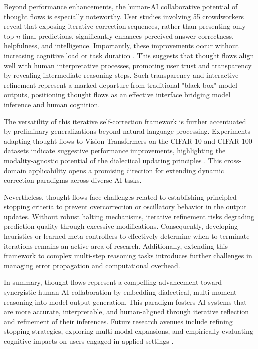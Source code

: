 \documentclass[sigconf]{acmart}
\begin{document}
Beyond performance enhancements, the human-AI collaborative potential of thought flows is especially noteworthy. User studies involving 55 crowdworkers reveal that exposing iterative correction sequences, rather than presenting only top-$n$ final predictions, significantly enhances perceived answer correctness, helpfulness, and intelligence. Importantly, these improvements occur without increasing cognitive load or task duration \cite{ref43}. This suggests that thought flows align well with human interpretative processes, promoting user trust and transparency by revealing intermediate reasoning steps. Such transparency and interactive refinement represent a marked departure from traditional "black-box" model outputs, positioning thought flows as an effective interface bridging model inference and human cognition.

The versatility of this iterative self-correction framework is further accentuated by preliminary generalizations beyond natural language processing. Experiments adapting thought flows to Vision Transformers on the CIFAR-10 and CIFAR-100 datasets indicate suggestive performance improvements, highlighting the modality-agnostic potential of the dialectical updating principles \cite{ref43}. This cross-domain applicability opens a promising direction for extending dynamic correction paradigms across diverse AI tasks.

Nevertheless, thought flows face challenges related to establishing principled stopping criteria to prevent overcorrection or oscillatory behavior in the output updates. Without robust halting mechanisms, iterative refinement risks degrading prediction quality through excessive modifications. Consequently, developing heuristics or learned meta-controllers to effectively determine when to terminate iterations remains an active area of research. Additionally, extending this framework to complex multi-step reasoning tasks introduces further challenges in managing error propagation and computational overhead.

In summary, thought flows represent a compelling advancement toward synergistic human-AI collaboration by embedding dialectical, multi-moment reasoning into model output generation. This paradigm fosters AI systems that are more accurate, interpretable, and human-aligned through iterative reflection and refinement of their inferences. Future research avenues include refining stopping strategies, exploring multi-modal expansions, and empirically evaluating cognitive impacts on users engaged in applied settings \cite{ref43}.
\end{document}
